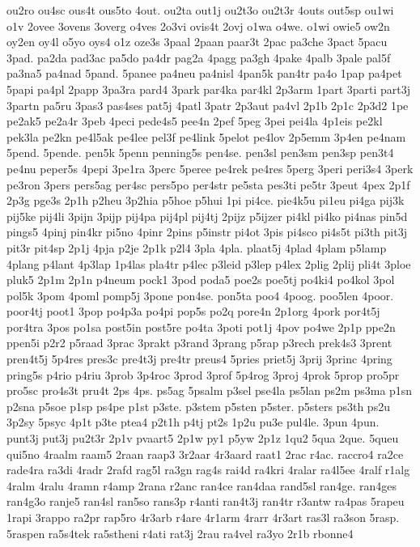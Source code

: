 {ou2ro
ou4sc
ous4t
ous5to
4out.
ou2ta
out1j
ou2t3o
ou2t3r
4outs
out5sp
ou1wi
o1v
2ovee
3ovens
3overg
o4ves
2o3vi
ovis4t
2ovj
o1wa
o4we.
o1wi
owie5
ow2n
oy2en
oy4l
o5yo
oys4
o1z
oze3s
3paal
2paan
paar3t
2pac
pa3che
3pact
5pacu
3pad.
pa2da
pad3ac
pa5do
pa4dr
pag2a
4pagg
pa3gh
4pake
4palb
3pale
pal5f
pa3na5
pa4nad
5pand.
5panee
pa4neu
pa4nisl
4pan5k
pan4tr
pa4o
1pap
pa4pet
5papi
pa4pl
2papp
3pa3ra
pard4
3park
par4ka
par4kl
2p3arm
1part
3parti
part3j
3partn
pa5ru
3pas3
pas4ses
pat5j
4patl
3patr
2p3aut
pa4vl
2p1b
2p1c
2p3d2
1pe
pe2ak5
pe2a4r
3peb
4peci
pede4s5
pee4n
2pef
5peg
3pei
pei4la
4p1eis
pe2kl
pek3la
pe2kn
pe4l5ak
pe4lee
pel3f
pe4link
5pelot
pe4lov
2p5emm
3p4en
pe4nam
5pend.
5pende.
pen5k
5penn
penning5s
pen4se.
pen3sl
pen3sm
pen3sp
pen3t4
pe4nu
peper5s
4pepi
3pe1ra
3perc
5peree
pe4rek
pe4res
5perg
3peri
peri3s4
3perk
pe3ron
3pers
pers5ag
per4sc
pers5po
per4str
pe5sta
pes3ti
pe5tr
3peut
4pex
2p1f
2p3g
pge3s
2p1h
p2heu
3p2hia
p5hoe
p5hui
1pi
pi4ce.
pie4k5u
pi1eu
pi4ga
pij3k
pij5ke
pij4li
3pijn
3pijp
pij4pa
pij4pl
pij4tj
2pijz
p5ijzer
pi4kl
pi4ko
pi4nas
pin5d
pings5
4pinj
pin4kr
pi5no
4pinr
2pins
p5instr
pi4ot
3pis
pi4sco
pi4s5t
pi3th
pit3j
pit3r
pit4sp
2p1j
4pja
p2je
2p1k
p2l4
3pla
4pla.
plaat5j
4plad
4plam
p5lamp
4plang
p4lant
4p3lap
1p4las
pla4tr
p4lec
p3leid
p3lep
p4lex
2plig
2plij
pli4t
3ploe
pluk5
2p1m
2p1n
p4neum
pock1
3pod
poda5
poe2s
poe5tj
po4ki4
po4kol
3pol
pol5k
3pom
4poml
pomp5j
3pone
pon4se.
pon5ta
poo4
4poog.
poo5len
4poor.
poor4tj
poot1
3pop
po4p3a
po4pi
pop5s
po2q
pore4n
2p1org
4pork
por4t5j
por4tra
3pos
po1sa
post5in
post5re
po4ta
3poti
pot1j
4pov
po4we
2p1p
ppe2n
ppen5i
p2r2
p5raad
3prac
3prakt
p3rand
3prang
p5rap
p3rech
prek4s3
3prent
pren4t5j
5p4res
pres3c
pre4t3j
pre4tr
preus4
5pries
priet5j
3prij
3princ
4pring
pring5s
p4rio
p4riu
3prob
3p4roc
3prod
3prof
5p4rog
3proj
4prok
5prop
pro5pr
pro5sc
pro4s3t
pru4t
2ps
4ps.
ps5ag
5psalm
p3sel
pse4la
ps5lan
ps2m
ps3ma
p1sn
p2sna
p5soe
p1sp
ps4pe
p1st
p3ste.
p3stem
p5sten
p5ster.
p5sters
ps3th
ps2u
3p2sy
5psyc
4p1t
p3te
ptea4
p2t1h
p4tj
pt2s
1p2u
pu3e
pul4le.
3pun
4pun.
punt3j
put3j
pu2t3r
2p1v
pvaart5
2p1w
py1
p5yw
2p1z
1qu2
5qua
2que.
5queu
qui5no
4raalm
raam5
2raan
raap3
3r2aar
4r3aard
raat1
2rac
r4ac.
raccro4
ra2ce
rade4ra
ra3di
4radr
2rafd
rag5l
ra3gn
rag4s
rai4d
ra4kri
4ralar
ra4l5ee
4ralf
r1alg
4ralm
4ralu
4ramn
r4amp
2rana
r2anc
ran4ce
ran4daa
rand5sl
ran4ge.
ran4ges
ran4g3o
ranje5
ran4sl
ran5so
rans3p
r4anti
ran4t3j
ran4tr
r3antw
ra4pas
5rapeu
1rapi
3rappo
ra2pr
rap5ro
4r3arb
r4are
4r1arm
4rarr
4r3art
ras3l
ra3son
5rasp.
5raspen
ra5s4tek
ra5stheni
r4ati
rat3j
2rau
ra4vel
ra3yo
2r1b
rbonne4
}
